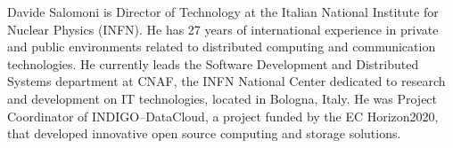 \documentclass[journal]{IEEEtran}
\begin{document}
\begin{IEEEbiography}{Davide Salomoni}
is Director of Technology at the Italian National Institute for Nuclear Physics (INFN). He has 27 years of international experience in private and public environments related to distributed computing and communication technologies. He currently leads the Software Development and Distributed Systems department at CNAF, the INFN National Center dedicated to research and development on IT technologies, located in Bologna, Italy. He was Project Coordinator of INDIGO--DataCloud, a project funded by the EC Horizon2020, that developed innovative open source computing and storage solutions.
\end{IEEEbiography}
\end{document}
